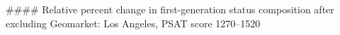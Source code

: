 #### Relative percent change in first-generation status composition after excluding Geomarket: Los Angeles, PSAT score 1270–1520
